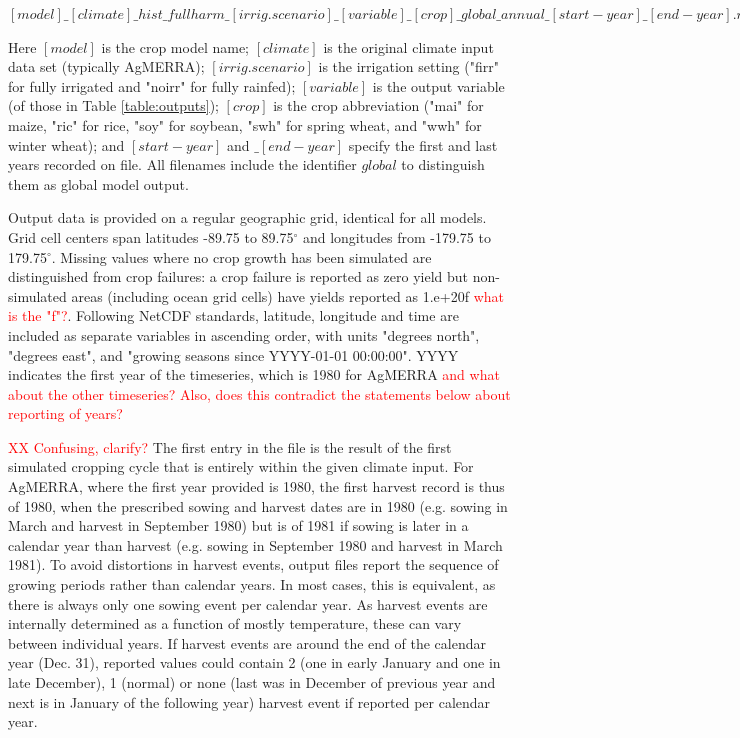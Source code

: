 \documentclass[gmd, manuscript]{copernicus} %
\begin{document}
{$[model]\_[climate]\_hist\_fullharm\_[irrig.scenario]\_[variable]\_[crop]\_global\_annual\_[start-year]\_[end-year].nc4$

\noindent Here $[model]$ is the crop model name; $[climate]$ is the original climate input data set (typically AgMERRA); $[irrig.scenario]$ is the irrigation setting ("firr" for fully irrigated and "noirr" for fully rainfed); $[variable]$ is the output variable (of those in Table \ref{table:outputs}); $[crop]$ is the crop abbreviation ("mai" for maize, "ric" for rice, "soy" for soybean, "swh" for spring wheat, and "wwh" for winter wheat); and $[start-year]$ and $\_[end-year]$ specify the first and last years recorded on file.
All filenames include the identifier $global$ to distinguish them as global model output.

Output data is provided on a regular geographic grid, identical for all models. 
Grid cell centers span latitudes -89.75 to 89.75$^{\circ}$ and longitudes from -179.75 to 179.75$^{\circ}$. 
Missing values  where no crop growth has been simulated are distinguished from crop failures: a crop failure is reported as zero yield but non-simulated areas (including ocean grid cells) have yields reported as 1.e+20f \textcolor{red}{what is the "f"?}. 
Following NetCDF standards, latitude, longitude and time are included as separate variables in ascending order, with
units "degrees north", "degrees east", and "growing seasons since YYYY-01-01 00:00:00". YYYY indicates the first year of the timeseries, which is 1980 for AgMERRA \textcolor{red}{and what about the other timeseries? Also, does this contradict the statements below about reporting of years?} 

\textcolor{red}{XX Confusing, clarify?} The first entry in the file is the result of the first simulated cropping cycle that is entirely within the given climate input. 
For AgMERRA, where the first year provided is 1980, the first harvest record is thus of 1980, when the prescribed sowing and harvest dates are in 1980 (e.g. sowing in March and harvest in September 1980) but is of 1981 if sowing is later in a calendar year than harvest (e.g. sowing in September 1980 and harvest in March 1981). 
To avoid distortions in harvest events, output files report the sequence of growing periods rather than calendar years. 
In most cases, this is equivalent, as there is always only one sowing event per calendar year.
As harvest events are internally determined as a function of mostly temperature, these can vary between individual years. 
If harvest events are around the end of the calendar year (Dec. 31), reported values could contain 2 (one in early January and one in late December), 1 (normal) or none (last was in December of previous year and next is in January of the following year) harvest event if reported per calendar year.

}
\end{document}
